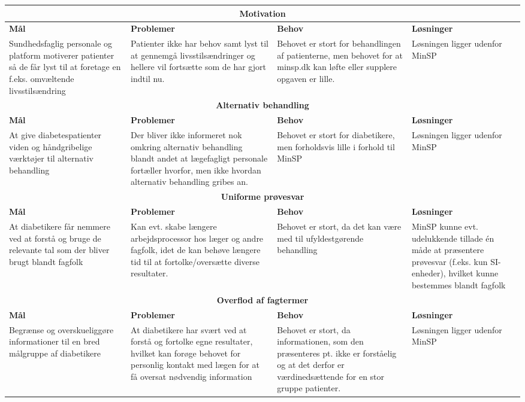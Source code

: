 \newpage

\begin{tabularx}{\textwidth}{|X|X|X|X|}
	\hline
	\multicolumn{4}{|c|}{\textbf{Motivation}}\\
	\hline
	\textbf{Mål} & \textbf{Problemer} & \textbf{Behov} & \textbf{Løsninger}\\
	\hline
	Sundhedsfaglig personale og platform motiverer patienter så de får lyst til at foretage en f.eks. omvæltende livsstilsændring&
	Patienter ikke har behov samt lyst til at gennemgå livsstilsændringer og hellere vil fortsætte som de har gjort indtil nu.&
	Behovet er stort for behandlingen af patienterne, men behovet for at minsp.dk kan løfte eller supplere opgaven er lille.&
	Løsningen ligger udenfor MinSP\\
	\hline
	\multicolumn{4}{|c|}{\textbf{Alternativ behandling}}\\
	\hline
	\textbf{Mål} & \textbf{Problemer} & \textbf{Behov} & \textbf{Løsninger}\\
	\hline
	At give diabetespatienter viden og håndgribelige værktøjer til alternativ behandling&
	Der bliver ikke informeret nok omkring alternativ behandling blandt andet at lægefagligt personale fortæller hvorfor, men ikke hvordan alternativ behandling gribes an.&
	Behovet er stort for diabetikere, men forholdsvis lille i forhold til MinSP&
	Løsningen ligger udenfor MinSP\\
	\hline
	\multicolumn{4}{|c|}{\textbf{Uniforme prøvesvar}}\\
	\hline
	\textbf{Mål} & \textbf{Problemer} & \textbf{Behov} & \textbf{Løsninger}\\
	\hline
	At diabetikere får nemmere ved at forstå og bruge de relevante tal som der bliver brugt blandt fagfolk&
	Kan evt. skabe længere arbejdsprocessor hos læger og andre fagfolk, idet de kan behøve længere tid til at fortolke/oversætte diverse resultater.&
	Behovet er stort, da det kan være med til ufyldestgørende behandling&
	MinSP kunne evt. udelukkende tillade én måde at præsentere prøvesvar (f.eks. kun SI-enheder), hvilket kunne bestemmes blandt fagfolk\\
	\hline
	\multicolumn{4}{|c|}{\textbf{Overflod af fagtermer}}\\
	\hline
	\textbf{Mål} & \textbf{Problemer} & \textbf{Behov} & \textbf{Løsninger}\\
	\hline
	Begrænse og overskueliggøre informationer til en bred målgruppe af diabetikere&
	At diabetikere har svært ved at forstå og fortolke egne resultater, hvilket kan forøge behovet for personlig kontakt med lægen for at få oversat nødvendig information&
	Behovet er stort, da informationen, som den præsenteres pt. ikke er forståelig og at det derfor er værdinedsættende for en stor gruppe patienter.&
	Løsningen ligger udenfor MinSP\\
	\hline
\end{tabularx}

